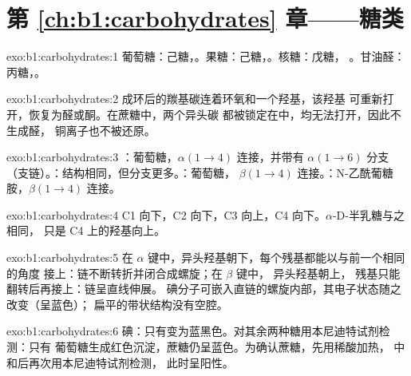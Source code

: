 \section*{第 \ref{ch:b1:carbohydrates} 章——糖类}

\begin{solution}{exo:b1:carbohydrates:1}
葡萄糖：己糖，。果糖：己糖，。核糖：戊糖，
。甘油醛：丙糖，。
\end{solution}

\begin{solution}{exo:b1:carbohydrates:2}
成环后的羰基碳连着环氧和一个羟基，该羟基
可重新打开，恢复为醛或酮。在蔗糖中，两个异头碳
都被锁定在中，均无法打开，因此不生成醛，
铜离子也不被还原。
\end{solution}

\begin{solution}{exo:b1:carbohydrates:3}
：葡萄糖，$\alpha(1{\to}4)$ 连接，并带有 $\alpha(1{\to}6)$ 分支
（支链）。：结构相同，但分支更多。：葡萄糖，
$\beta(1{\to}4)$ 连接。：N-乙酰葡糖胺，$\beta(1{\to}4)$ 连接。
\end{solution}

\begin{solution}{exo:b1:carbohydrates:4}
C1 向下，C2 向下，C3 向上，C4 向下。$\alpha$-D-半乳糖与之相同，
只是 C4 上的羟基向上。
\end{solution}

\begin{solution}{exo:b1:carbohydrates:5}
在 $\alpha$ 键中，异头羟基朝下，每个残基都能以与前一个相同的角度
接上：链不断转折并闭合成螺旋；在 $\beta$ 键中，
异头羟基朝上，
残基只能翻转后再接上：链呈直线伸展。
碘分子可嵌入直链的螺旋内部，其电子状态随之改变（呈蓝色）；
扁平的带状结构没有空腔。
\end{solution}

\begin{solution}{exo:b1:carbohydrates:6}
碘：只有变为蓝黑色。对其余两种糖用本尼迪特试剂检测：只有
葡萄糖生成红色沉淀，蔗糖仍呈蓝色。为确认蔗糖，先用稀酸加热，
中和后再次用本尼迪特试剂检测，
此时呈阳性。
\end{solution}

